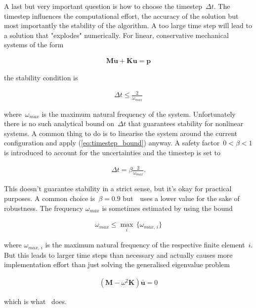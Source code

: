 A last but very important question is how to choose the timestep~$\Delta t$.
The timestep influences the computational effort, the accuracy of the solution but most importantly the stability of the algorithm.
A too large time step will lead to a solution that "explodes" numerically.
For linear, conservative mechanical systems of the form

\begin{align}
\boldsymbol{M}\ddot{\boldsymbol{u}} + \boldsymbol{K}\boldsymbol{u} = \boldsymbol{p}
\end{align}

the stability condition is

\begin{align}
\Delta t \le \frac{2}{\omega_{max}}\label{eq:timestep_bound}
\end{align}

where~$\omega_{max}$ is the maximum natural frequency \cite{bib:dynamic_solution} of the system.
Unfortunately there is no such analytical bound on~$\Delta t$ that guarantees stability for nonlinear systems.
A common thing to do is to linearise the system around the current configuration and apply (\ref{eq:timestep_bound}) anyway.
A safety factor~$0 < \beta < 1$ is introduced to account for the uncertainties and the timestep is set to

\begin{align}
\Delta t = \beta \frac{2}{\omega_{max}}.
\end{align}

This doesn't guarantee stability in a strict sense, but it's okay for practical purposes. A common choice is~$\beta = 0.9$ but~\swtitle\ uses a lower value for the sake of robustness. The frequency $\omega_{max}$ is sometimes estimated by using the bound

\begin{align}
\omega_{max} \le \max_{i}\,\{\omega_{max,\,i}\}
\end{align}

where $\omega_{max,\,i}$ is the maximum natural frequency of the respective finite element~$i$. But this leads to larger time steps than necessary and actually causes more implementation effort than just solving the generalised eigenvalue problem

\begin{align}
\left(\boldsymbol{M} - \omega^2\boldsymbol{K}\right)\boldsymbol{\bar{u}} = 0\label{eq:natural_frequencies}
\end{align}

which is what \swtitle\ does.

